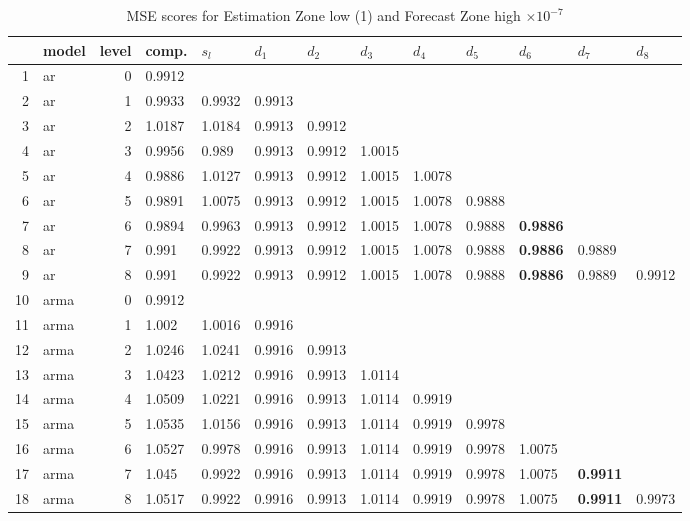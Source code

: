 \documentclass[10pt,a4paper]{article}
\begin{document}
\begin{table}[ht]
\centering
\caption{MSE scores for Estimation Zone low (1) and Forecast Zone high $ \times 10^{-7}$} 
\begin{tabular}{rlrllllllllll}
  \hline
 & model & level & comp. & $s_l$ & $d_1$ & $d_2$ & $d_3$ & $d_4$ & $d_5$ & $d_6$ & $d_7$ & $d_8$ \\ 
  \hline
1 & ar &     0 & 0.9912 &  &  &  &  &  &  &  &  &  \\ 
  2 & ar &     1 & 0.9933 & 0.9932 & 0.9913 &  &  &  &  &  &  &  \\ 
  3 & ar &     2 & 1.0187 & 1.0184 & 0.9913 & 0.9912 &  &  &  &  &  &  \\ 
  4 & ar &     3 & 0.9956 & 0.989 & 0.9913 & 0.9912 & 1.0015 &  &  &  &  &  \\ 
  5 & ar &     4 & 0.9886 & 1.0127 & 0.9913 & 0.9912 & 1.0015 & 1.0078 &  &  &  &  \\ 
  6 & ar &     5 & 0.9891 & 1.0075 & 0.9913 & 0.9912 & 1.0015 & 1.0078 & 0.9888 &  &  &  \\ 
  7 & ar &     6 & 0.9894 & 0.9963 & 0.9913 & 0.9912 & 1.0015 & 1.0078 & 0.9888 & \textbf{0.9886} &  &  \\ 
  8 & ar &     7 & 0.991 & 0.9922 & 0.9913 & 0.9912 & 1.0015 & 1.0078 & 0.9888 & \textbf{0.9886} & 0.9889 &  \\ 
  9 & ar &     8 & 0.991 & 0.9922 & 0.9913 & 0.9912 & 1.0015 & 1.0078 & 0.9888 & \textbf{0.9886} & 0.9889 & 0.9912 \\ 
   \hline
10 & arma &     0 & 0.9912 &  &  &  &  &  &  &  &  &  \\ 
  11 & arma &     1 & 1.002 & 1.0016 & 0.9916 &  &  &  &  &  &  &  \\ 
  12 & arma &     2 & 1.0246 & 1.0241 & 0.9916 & 0.9913 &  &  &  &  &  &  \\ 
  13 & arma &     3 & 1.0423 & 1.0212 & 0.9916 & 0.9913 & 1.0114 &  &  &  &  &  \\ 
  14 & arma &     4 & 1.0509 & 1.0221 & 0.9916 & 0.9913 & 1.0114 & 0.9919 &  &  &  &  \\ 
  15 & arma &     5 & 1.0535 & 1.0156 & 0.9916 & 0.9913 & 1.0114 & 0.9919 & 0.9978 &  &  &  \\ 
  16 & arma &     6 & 1.0527 & 0.9978 & 0.9916 & 0.9913 & 1.0114 & 0.9919 & 0.9978 & 1.0075 &  &  \\ 
  17 & arma &     7 & 1.045 & 0.9922 & 0.9916 & 0.9913 & 1.0114 & 0.9919 & 0.9978 & 1.0075 & \textbf{0.9911} &  \\ 
  18 & arma &     8 & 1.0517 & 0.9922 & 0.9916 & 0.9913 & 1.0114 & 0.9919 & 0.9978 & 1.0075 & \textbf{0.9911} & 0.9973 \\ 

\end{tabular}
\end{table}
\end{document}
